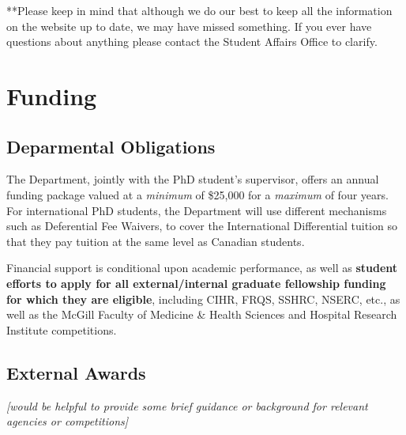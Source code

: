 \documentclass[
]{book}
\begin{document}
**Please keep in mind that although we do our best to keep all the information on the website up to date, we may have missed something. If you ever have questions about anything please contact the Student Affairs Office to clarify.

\hypertarget{funding}{%
\chapter{Funding}\label{funding}}

\hypertarget{deparmental-obligations}{%
\section{Deparmental Obligations}\label{deparmental-obligations}}

The Department, jointly with the PhD student's supervisor, offers an annual funding package valued at a \emph{minimum} of \$25,000 for a \emph{maximum} of four years. For international PhD students, the Department will use different mechanisms such as Deferential Fee Waivers, to cover the International Differential tuition so that they pay tuition at the same level as Canadian students.

Financial support is conditional upon academic performance, as well as \textbf{student efforts to apply for all external/internal graduate fellowship funding for which they are eligible}, including CIHR, FRQS, SSHRC, NSERC, etc., as well as the McGill Faculty of Medicine \& Health Sciences and Hospital Research Institute competitions.

\hypertarget{external-awards}{%
\section{External Awards}\label{external-awards}}

\emph{{[}would be helpful to provide some brief guidance or background for relevant agencies or competitions{]}}

  
\end{document}

